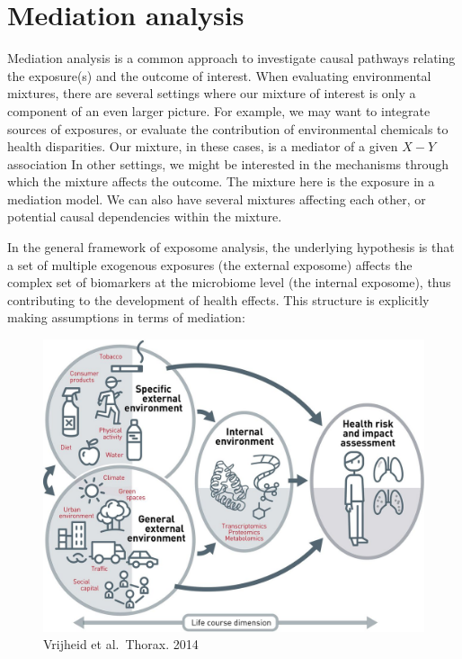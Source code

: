 \documentclass[
]{book}
\begin{document}
\hypertarget{mediation-analysis}{%
\section{Mediation analysis}\label{mediation-analysis}}

Mediation analysis is a common approach to investigate causal pathways relating the exposure(s) and the outcome of interest. When evaluating environmental mixtures, there are several settings where our mixture of interest is only a component of an even larger picture.
For example, we may want to integrate sources of exposures, or evaluate the contribution of environmental chemicals to health disparities. Our mixture, in these cases, is a mediator of a given \(X-Y\) association
In other settings, we might be interested in the mechanisms through which the mixture affects the outcome. The mixture here is the exposure in a mediation model.
We can also have several mixtures affecting each other, or potential causal dependencies within the mixture.

In the general framework of exposome analysis, the underlying hypothesis is that a set of multiple exogenous exposures (the external exposome) affects the complex set of biomarkers at the microbiome level (the internal exposome), thus contributing to the development of health effects. This structure is explicitly making assumptions in terms of mediation:

\begin{figure}
\centering
\includegraphics{images/exposome.jpg}
\caption{Vrijheid et al.~Thorax. 2014}
\end{figure}
\end{document}
